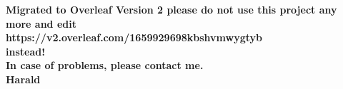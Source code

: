 \documentclass[url,11pt]{article}
\def\biblio{}
\begin{document}
\dosecttoc

\def\biblio{} %
\togglefalse{standalone}

\textbf{Migrated to Overleaf Version 2
please do not use this project any more and edit\\
https://v2.overleaf.com/1659929698kbshvmwygtyb\\
instead!\\
In case of problems, please contact me.\\
Harald}
\newpage



% 

% 

% 

% 

% 

% 
% 
% 
% 
% 

% 
% 
% 
% 


% 

% 

% 
% 



\end{document}
